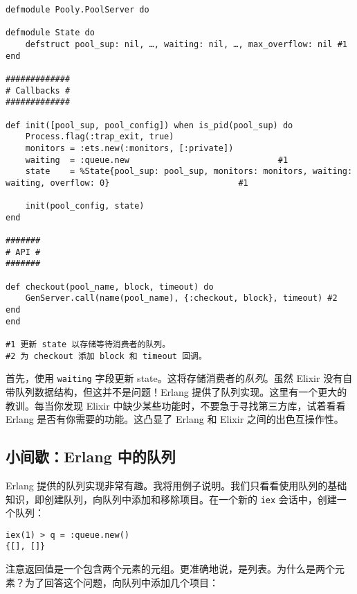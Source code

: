 \begin{code}{}
\begin{verbatim}
defmodule Pooly.PoolServer do

defmodule State do
    defstruct pool_sup: nil, …, waiting: nil, …, max_overflow: nil #1
end

#############
# Callbacks #
#############

def init([pool_sup, pool_config]) when is_pid(pool_sup) do
    Process.flag(:trap_exit, true)
    monitors = :ets.new(:monitors, [:private])
    waiting  = :queue.new                              #1
    state    = %State{pool_sup: pool_sup, monitors: monitors, waiting: waiting, overflow: 0}                          #1

    init(pool_config, state)
end

#######
# API #
#######

def checkout(pool_name, block, timeout) do
    GenServer.call(name(pool_name), {:checkout, block}, timeout) #2
end
end

#1 更新 state 以存储等待消费者的队列。
#2 为 checkout 添加 block 和 timeout 回调。
\end{verbatim}
\end{code}



首先，使用 \texttt{waiting} 字段更新
state。这将存储消费者的\emph{队列}。虽然 Elixir
没有自带队列数据结构，但这并不是问题！Erlang
提供了队列实现。这里有一个更大的教训。每当你发现 Elixir
中缺少某些功能时，不要急于寻找第三方库，试着看看 Erlang
是否有你需要的功能。这凸显了 Erlang 和 Elixir 之间的出色互操作性。

\subsection{小间歇：Erlang 中的队列}

Erlang
提供的队列实现非常有趣。我将用例子说明。我们只看看使用队列的基础知识，即创建队列，向队列中添加和移除项目。在一个新的
\texttt{iex} 会话中，创建一个队列：

\begin{code}{}
\begin{verbatim}
iex(1) > q = :queue.new()
{[], []}
\end{verbatim}
\end{code}

注意返回值是一个包含两个元素的元组。更准确地说，是列表。为什么是两个元素？为了回答这个问题，向队列中添加几个项目：

